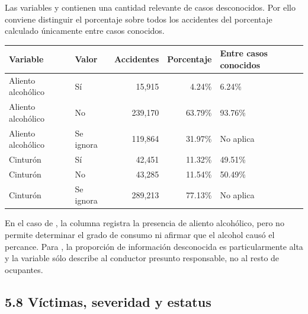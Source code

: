 \documentclass[11pt,letterpaper]{article}
\begin{document}
\begin{nota}
Las variables  y  contienen una cantidad relevante
de casos desconocidos. Por ello conviene distinguir el porcentaje sobre todos
los accidentes del porcentaje calculado únicamente entre casos conocidos.

\vspace{0.4em}
\begin{tabularx}{\textwidth}{L{2.4cm}L{2.2cm}rrY}
    \toprule
    \textbf{Variable} & \textbf{Valor} & \textbf{Accidentes}
        & \textbf{Porcentaje} & \textbf{Entre casos conocidos} \\
    \midrule
    Aliento alcohólico & Sí & 15,915 & 4.24\% & 6.24\% \\
    Aliento alcohólico & No & 239,170 & 63.79\% & 93.76\% \\
    Aliento alcohólico & Se ignora & 119,864 & 31.97\% & No aplica \\
    \midrule
    Cinturón & Sí & 42,451 & 11.32\% & 49.51\% \\
    Cinturón & No & 43,285 & 11.54\% & 50.49\% \\
    Cinturón & Se ignora & 289,213 & 77.13\% & No aplica \\
    \bottomrule
\end{tabularx}

\vspace{0.4em}
En el caso de , la columna registra la presencia de aliento
alcohólico, pero no permite determinar el grado de consumo ni afirmar que el
alcohol causó el percance. Para , la proporción de información
desconocida es particularmente alta y la variable sólo describe al conductor
presunto responsable, no al resto de ocupantes.
\end{nota}

\subsection*{5.8 Víctimas, severidad y estatus}
\end{document}
